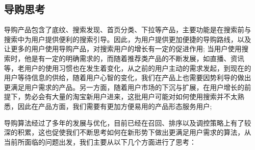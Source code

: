 \subsection{导购思考} 
导购产品包含了底纹、搜索发现、首页分类、下拉等产品，主要功能是在搜索前与搜索中为用户提供便利的搜索引导。因此，为用户提供更加便捷的导购路线，以及让更多的用户使用导购产品，对搜索用户的增长有一定的促进作用; 
当用户使用搜索时，他是有一定的明确需求的，而随着推荐类产品的不断发展，如直播、资讯等，老用户的使用习惯也在发生着变化，从之前的用户主动的需求发起，到现在的用户等待信息的供给，随着用户心智的变化，我们在产品上也需要因势利导的做出更满足用户需求的产品。另一方面，随着用户市场的下沉与扩展，在用户增长的前提下，势必会有大量的淘宝新用户进来，这批用户可能对如何使用搜索并不太熟悉，因此在产品方面，我们需要有更加方便易用的产品形态服务用户; 

导购算法经过了多年的发展与优化，目前已经在召回、排序以及调控策略上有了较深的积累，这也促使我们不断思考如何在新形势下做出更满足用户需求的算法，从当前所面临的问题出发，我们主要从以下几个方面进行了思考：

